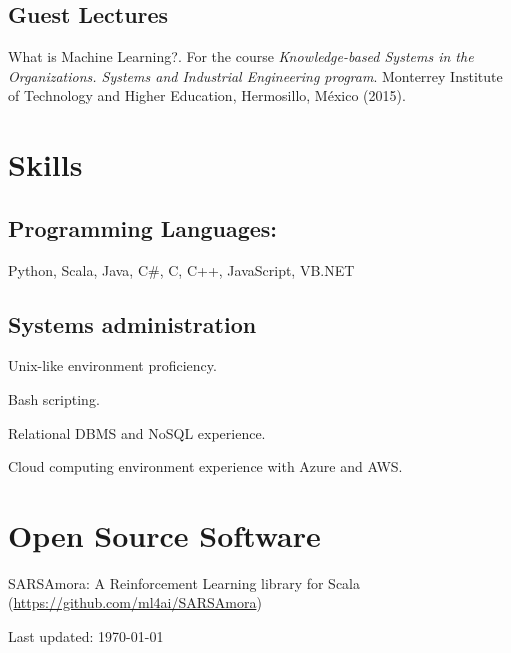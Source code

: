 \documentclass[letterpaper]{article}
\def\footerlink{http://jblevins.org/projects/cv-template/}
\renewenvironment{itemize}{
  \begin{list}{}{
    \setlength{\leftmargin}{1.5em}
  }
}{
  \end{list}
}
\begin{document}
\subsection*{Guest Lectures}
\begin{itemize}
	\item What is Machine Learning?. For the course \textit{Knowledge-based Systems in the Organizations. Systems and Industrial Engineering program}. Monterrey Institute of Technology and Higher Education, Hermosillo, M\'{e}xico (2015).
\end{itemize}


\section*{Skills}
\subsection*{Programming Languages:}
\begin{itemize}
	\item Python, Scala, Java, C\#, C, C++, JavaScript, VB.NET
\end{itemize}


\subsection*{Systems administration}
\begin{itemize}
	\item Unix-like environment proficiency.
	\item Bash scripting.
	\item Relational DBMS and NoSQL experience.
	\item Cloud computing environment experience with Azure and AWS.
\end{itemize}

\section*{Open Source Software}
\begin{itemize}
	\item SARSAmora: A Reinforcement Learning library for Scala (\url{https://github.com/ml4ai/SARSAmora})
\end{itemize}
\bigskip

\begin{center}
  \begin{footnotesize}
    Last updated: \today \\
  \end{footnotesize}
\end{center}
\end{document}
